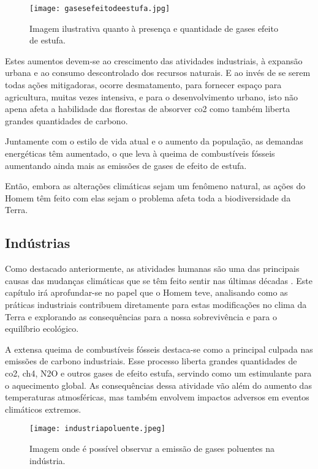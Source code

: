 \documentclass{report}
\begin{document}
\begin{figure}[H]
	\centering
	\texttt{[image: gasesefeitodeestufa.jpg]}
	\caption{Imagem ilustrativa quanto à presença e quantidade de gases efeito de estufa.}
	\label{fig:gases-efeito-de-estufa}
\end{figure}

Estes aumentos devem-se ao crescimento das atividades industriais, à expansão urbana e ao consumo descontrolado dos recursos naturais. E ao invés de se serem todas ações mitigadoras, ocorre desmatamento, para fornecer espaço para agricultura, muitas vezes intensiva, e para o desenvolvimento urbano, isto não apena afeta a habilidade das florestas de absorver \ac{co2} como também liberta grandes quantidades de carbono.

Juntamente com o estilo de vida atual e o aumento da população, as demandas energéticas têm aumentado, o que leva à queima de combustíveis fósseis aumentando ainda mais as emissões de gases de efeito de estufa.

Então, embora as alterações climáticas sejam um fenômeno natural, as ações do Homem têm feito com elas sejam o problema afeta toda a biodiversidade da Terra.


\subsection{Indústrias}
Como destacado anteriormente, as atividades humanas são uma das principais causas das mudanças climáticas que se têm feito sentir nas últimas décadas . Este capítulo irá aprofundar-se no papel que o Homem teve, analisando como as práticas industriais contribuem diretamente para estas modificações no clima da Terra e explorando as consequências para a nossa sobrevivência e para o equilíbrio ecológico.

A extensa queima de combustíveis fósseis destaca-se como a principal culpada nas emissões de carbono industriais. Esse processo liberta grandes quantidades de \ac{co2}, \ac{ch4}, N2O e outros gases de efeito estufa, servindo como um estimulante para o aquecimento global. As consequências dessa atividade vão além do aumento das temperaturas atmosféricas, mas também envolvem impactos adversos em eventos climáticos extremos.

\begin{figure}[H]
	\centering
	\texttt{[image: industriapoluente.jpeg]}
	\caption{Imagem onde é possível observar a emissão de gases poluentes na indústria.}
	\label{fig:gases-industria}
\end{figure}
\end{document}
